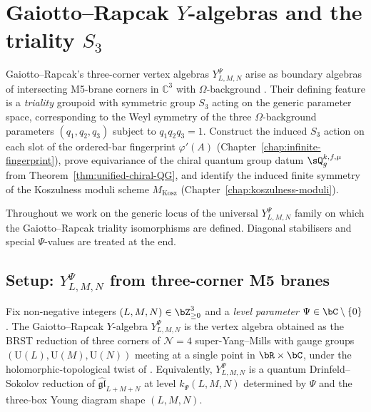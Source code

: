 \chapter{Gaiotto--Rapcak $Y$-algebras and the triality $S_3$}
\label{ch:y-algebras-triality}

Gaiotto--Rapcak's three-corner vertex algebras $Y_{L,M,N}^\Psi$ arise as
boundary algebras of intersecting M5-brane corners in $\mathbb{C}^3$ with
$\Omega$-background \cite{GaiottoRapcak2017}. Their defining feature is
a \emph{triality} groupoid with symmetric group $S_3$ acting on the
generic parameter space, corresponding to the Weyl symmetry of the three
$\Omega$-background parameters $(q_1, q_2, q_3)$ subject to
$q_1 q_2 q_3 = 1$. Construct the induced $S_3$ action on each slot of
the ordered-bar fingerprint $\varphi'(A)$
(Chapter~\ref{chap:infinite-fingerprint}), prove equivariance of the
chiral quantum group datum $\sQ_g^{k,f,\mu}$ from
Theorem~\ref{thm:unified-chiral-QG}, and identify the induced finite
symmetry of the Koszulness moduli scheme
$M_{\mathrm{Kosz}}$ (Chapter~\ref{chap:koszulness-moduli}).

Throughout we work on the generic locus of the universal
$Y_{L,M,N}^{\Psi}$ family on which the Gaiotto--Rapcak triality
isomorphisms are defined. Diagonal stabilisers and special
$\Psi$-values are treated at the end.

\section{Setup: $Y_{L,M,N}^\Psi$ from three-corner M5 branes}
\label{sec:y-algebra-setup}

\begin{definition}
\label{def:y-algebra}
Fix non-negative integers $(L,M,N) \in \bZ_{\ge 0}^3$ and a
\emph{level parameter} $\Psi \in \bC \setminus \{0\}$. The
Gaiotto--Rapcak $Y$-algebra $Y_{L,M,N}^\Psi$ is the vertex algebra
obtained as the BRST reduction of three corners of
$\mathcal{N}=4$ super-Yang--Mills with gauge groups
$(\mathrm{U}(L), \mathrm{U}(M), \mathrm{U}(N))$ meeting at a single
point in $\bR \times \bC$, under the holomorphic-topological twist of
\cite{CostelloGaiotto2018}. Equivalently, $Y_{L,M,N}^\Psi$ is a
quantum Drinfeld--Sokolov reduction of
$\widehat{\mathfrak{gl}}_{L+M+N}$ at level
$k_\Psi(L,M,N)$ determined by $\Psi$ and the three-box Young diagram
shape $(L,M,N)$.
\end{definition}

